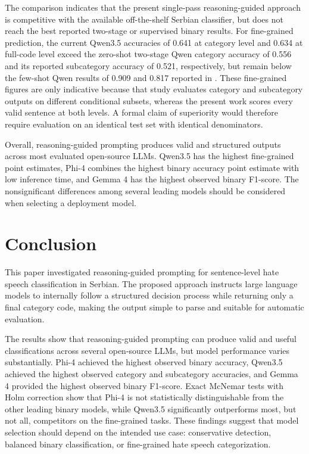\documentclass[a4paper]{article}
\begin{document}
The comparison indicates that the present single-pass reasoning-guided approach is competitive with the available off-the-shelf Serbian classifier, but does not reach the best reported two-stage or supervised binary results. For fine-grained prediction, the current Qwen3.5 accuracies of 0.641 at category level and 0.634 at full-code level exceed the zero-shot two-stage Qwen category accuracy of 0.556 and its reported subcategory accuracy of 0.521, respectively, but remain below the few-shot Qwen results of 0.909 and 0.817 reported in \cite{dodovic2026access}. These fine-grained figures are only indicative because that study evaluates category and subcategory outputs on different conditional subsets, whereas the present work scores every valid sentence at both levels. A formal claim of superiority would therefore require evaluation on an identical test set with identical denominators.

Overall, reasoning-guided prompting produces valid and structured outputs across most evaluated open-source LLMs. Qwen3.5 has the highest fine-grained point estimates, Phi-4 combines the highest binary accuracy point estimate with low inference time, and Gemma 4 has the highest observed binary F1-score. The nonsignificant differences among several leading models should be considered when selecting a deployment model.

\section{Conclusion}

This paper investigated reasoning-guided prompting for sentence-level hate speech classification in Serbian. The proposed approach instructs large language models to internally follow a structured decision process while returning only a final category code, making the output simple to parse and suitable for automatic evaluation.

The results show that reasoning-guided prompting can produce valid and useful classifications across several open-source LLMs, but model performance varies substantially. Phi-4 achieved the highest observed binary accuracy, Qwen3.5 achieved the highest observed category and subcategory accuracies, and Gemma 4 provided the highest observed binary F1-score. Exact McNemar tests with Holm correction show that Phi-4 is not statistically distinguishable from the other leading binary models, while Qwen3.5 significantly outperforms most, but not all, competitors on the fine-grained tasks. These findings suggest that model selection should depend on the intended use case: conservative detection, balanced binary classification, or fine-grained hate speech categorization.
\end{document}
